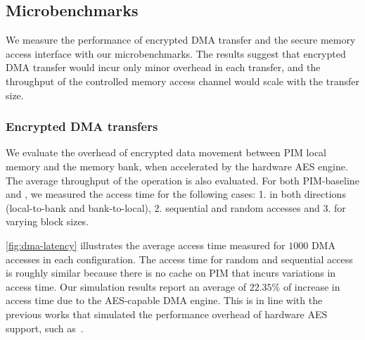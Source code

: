 \subsection{Microbenchmarks}
\label{subsect:aes-dma}
\label{subsec:microbench}
We measure the performance of encrypted DMA transfer and the secure memory access interface with our microbenchmarks. The results suggest that encrypted DMA transfer would incur only minor overhead in each transfer, and the throughput of the controlled memory access channel would scale with the transfer size.











\subsubsection{Encrypted DMA transfers}
We evaluate the overhead of encrypted data movement between PIM local memory and the memory bank, when accelerated by the hardware AES engine. The average throughput of the operation is also evaluated. For both PIM-baseline and \thename, we measured the access time for the following cases: 1. in both directions (local-to-bank and bank-to-local), 2. sequential and random accesses and 3. for varying block sizes.

  \autoref{fig:dma-latency} illustrates the average access time measured for $1000$ DMA accesses in each configuration. The access time for random and sequential access is roughly similar because there is no cache on PIM that incurs variations in access time. Our simulation results report an average of $22.35$\% of increase in access time due to the AES-capable DMA engine. This is in line with the previous works that simulated the performance overhead of hardware AES support, such as~\cite{obfusmem,invisimem}. 

